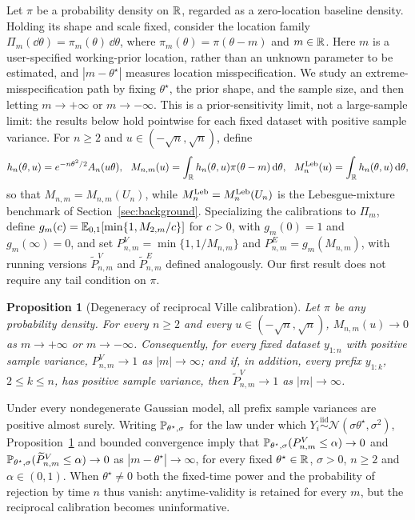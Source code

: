 \documentclass{article}
\newtheorem{proposition}{Proposition}
\newcommand{\iid}{\stackrel{\mathrm{iid}}{\sim}}
\begin{document}
Let $\pi$ be a probability density on $\mathbb{R}$, regarded as a zero-location
baseline density. Holding its shape and scale fixed, consider the
location family $\Pi_m(\dd\theta)=\pi_m(\theta)\,\dd\theta$, where
$\pi_m(\theta)=\pi(\theta-m)$ and $m\in\mathbb{R}$. Here $m$ is a user-specified
working-prior location, rather than an unknown parameter to be estimated,
and $|m-\theta^\star|$ measures location misspecification. We study an
extreme-misspecification path by fixing $\theta^\star$, the prior shape,
and the sample size, and then letting $m\to+\infty$ or $m\to-\infty$.
This is a prior-sensitivity limit, not a large-sample limit: the results
below hold pointwise for each fixed dataset with positive sample
variance. For $n\geq2$ and $u\in(-\sqrt n,\sqrt n)$, define
\begin{equation}
\label{eq:hnu-def}
  h_n(\theta,u)=e^{-n\theta^2/2}A_n(u\theta),
  \ \
  M_{n,m}(u)=\int_{\mathbb{R}} h_n(\theta,u)\pi(\theta-m)\,\mathrm{d}\theta,
  \ \
  M_n^{\mathrm{Leb}}(u)=\int_{\mathbb{R}} h_n(\theta,u)\,\mathrm{d}\theta,
\end{equation}
so that $M_{n,m}=M_{n,m}(U_n)$, while $M_n^{\mathrm{Leb}}=M_n^{\mathrm{Leb}}(U_n)$ is the
Lebesgue-mixture benchmark of Section~\ref{sec:background}. Specializing
the calibrations to $\Pi_m$, define
$g_m(c)=\mathbb{E}_{0,1}[\min\{1,M_{2,m}/c\}]$ for $c>0$, with $g_m(0)=1$ and
$g_m(\infty)=0$, and set $P_{n,m}^V=\min\{1,1/M_{n,m}\}$ and
$P_{n,m}^E=g_m(M_{n,m})$, with running versions
$\widetilde P_{n,m}^V$ and $\widetilde P_{n,m}^E$ defined analogously.
Our first result does not require any tail condition on $\pi$.

\begin{proposition}[Degeneracy of reciprocal Ville calibration]
\label{prop:ville-degeneracy}
Let $\pi$ be any probability density. For every $n\geq2$ and every
$u\in(-\sqrt n,\sqrt n)$, $M_{n,m}(u)\to0$ as $m\to+\infty$ or
$m\to-\infty$. Consequently, for every fixed dataset $y_{1:n}$ with
positive sample variance, $P_{n,m}^V\to1$ as $|m|\to\infty$; and if, in
addition, every prefix $y_{1:k}$, $2\leq k\leq n$, has positive sample
variance, then $\widetilde P_{n,m}^V\to1$ as $|m|\to\infty$.
\end{proposition}

Under every nondegenerate Gaussian model, all prefix sample variances are
positive almost surely. Writing $\mathbb{P}_{\theta^\star,\sigma}$ for the law
under which $Y_i\iid\mathcal N(\sigma\theta^\star,\sigma^2)$,
Proposition~\ref{prop:ville-degeneracy} and bounded convergence imply
that $\mathbb{P}_{\theta^\star,\sigma}(P_{n,m}^V\leq\alpha)\to0$ and
$\mathbb{P}_{\theta^\star,\sigma}(\widetilde P_{n,m}^V\leq\alpha)\to0$ as
$|m-\theta^\star|\to\infty$, for every fixed $\theta^\star\in\mathbb{R}$,
$\sigma>0$, $n\geq2$ and $\alpha\in(0,1)$. When $\theta^\star\neq0$ both
the fixed-time power and the probability of rejection by time $n$ thus
vanish: anytime-validity is retained for every $m$, but the reciprocal
calibration becomes uninformative.
\end{document}
